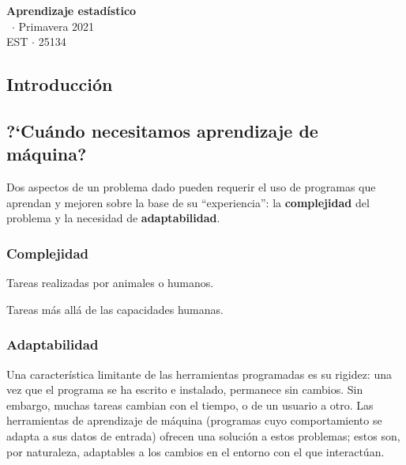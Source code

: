 \documentclass[8pt,a4paper]{extarticle}
\renewcommand{\csClass}{Aprendizaje estadístico}
\renewcommand{\csClassCode}{EST $\cdot$ 25134}
\renewcommand{\csTerm}{Primavera 2021}
\begin{document}
\begin{titlepage}
	\begin{center}
		\vspace*{1cm}
		\Huge
		\textbf{\csClass}
		\vspace{0.5cm} \\
		\Large
		\cs\ $\cdot$ \csTerm
		\vfill
		\csAuthorName\\
		\vspace{0.8cm}
		\csClassCode\\
		\csSchool
	\end{center}
\end{titlepage}

\begin{multicols}{3}
	\setcounter{page}{1}

	\section*{Introducción}

	\subsection*{?`Cuándo necesitamos aprendizaje de máquina?}

	Dos aspectos de un problema dado pueden requerir el uso de programas que aprendan y mejoren sobre la base de su ``experiencia'': la \textbf{complejidad} del problema y la necesidad de \textbf{adaptabilidad}.

	\subsubsection*{Complejidad}

	\begin{bulletlist}
		\item Tareas realizadas por animales o humanos.
		\item Tareas más allá de las capacidades humanas.
	\end{bulletlist}

	\subsubsection*{Adaptabilidad}

	Una característica limitante de las herramientas programadas es su rigidez: una vez que el programa se ha escrito e instalado, permanece sin cambios. Sin embargo, muchas tareas cambian con el tiempo, o de un usuario a otro. Las herramientas de aprendizaje de máquina (programas cuyo comportamiento se adapta a sus datos de entrada) ofrecen una solución a estos problemas; estos son, por naturaleza, adaptables a los cambios en el entorno con el que interactúan.


\end{multicols}
\end{document}
